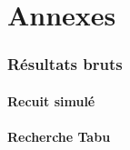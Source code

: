 \part*{Annexes}

\stopcontents

\startcontents[sections]

\setcounter{section}{0}

\newpage

\section{Résultats bruts}

\subsection{Recuit simulé}



\newpage


\subsection{Recherche Tabu}

\begin{centering}
  
\end{centering}

